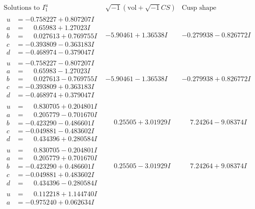 \documentclass[1p]{elsarticle_modified}
\theoremstyle{definition}
\newcommand{\I}{\sqrt{-1}}
\begin{document}
$$\begin{array}{c|c|c}  
\text{Solutions to }I^u_{1}& \I (\text{vol} + \sqrt{-1}CS) & \text{Cusp shape}\\
 \hline 
\begin{aligned}
u &= -0.758227 + 0.807207 I \\
a &= \phantom{-}0.65983 + 1.27023 I \\
b &= \phantom{-}0.027613 + 0.769755 I \\
c &= -0.393809 - 0.363183 I \\
d &= -0.468974 - 0.379047 I\end{aligned}
 & -5.90461 + 1.36538 I & -0.279938 - 0.826772 I \\ \hline\begin{aligned}
u &= -0.758227 - 0.807207 I \\
a &= \phantom{-}0.65983 - 1.27023 I \\
b &= \phantom{-}0.027613 - 0.769755 I \\
c &= -0.393809 + 0.363183 I \\
d &= -0.468974 + 0.379047 I\end{aligned}
 & -5.90461 - 1.36538 I & -0.279938 + 0.826772 I \\ \hline\begin{aligned}
u &= \phantom{-}0.830705 + 0.204801 I \\
a &= \phantom{-}0.205779 - 0.701670 I \\
b &= -0.423290 - 0.486601 I \\
c &= -0.049881 - 0.483602 I \\
d &= \phantom{-}0.434396 + 0.280584 I\end{aligned}
 & \phantom{-}0.25505 + 3.01929 I & \phantom{-}7.24264 - 9.08374 I \\ \hline\begin{aligned}
u &= \phantom{-}0.830705 - 0.204801 I \\
a &= \phantom{-}0.205779 + 0.701670 I \\
b &= -0.423290 + 0.486601 I \\
c &= -0.049881 + 0.483602 I \\
d &= \phantom{-}0.434396 - 0.280584 I\end{aligned}
 & \phantom{-}0.25505 - 3.01929 I & \phantom{-}7.24264 + 9.08374 I \\ \hline\begin{aligned}
u &= \phantom{-}0.112218 + 1.144740 I \\
a &= -0.975240 + 0.062634 I \\

\end{aligned}
\end{array}$$
\end{document}
